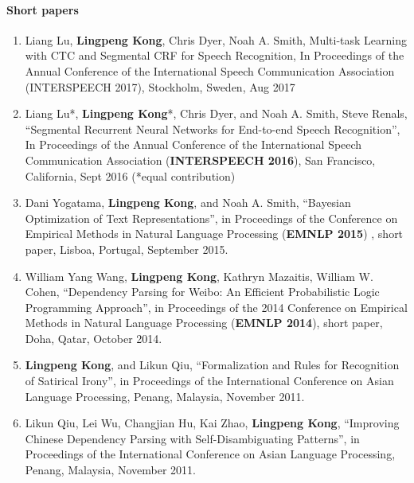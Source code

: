\documentclass[letterpaper]{article}
\begin{document}
\paragraph*{Short papers}
\begin{enumerate}
  \item \label{ctcsegrnn} Liang Lu, \textbf{Lingpeng Kong}, Chris Dyer, Noah A. Smith, Multi-task Learning with CTC and Segmental CRF for Speech Recognition, In Proceedings of the Annual Conference of the International Speech Communication Association (INTERSPEECH 2017), Stockholm, Sweden, Aug 2017

  \item \label{interspeech2016} Liang Lu*, \textbf{Lingpeng Kong}*, Chris Dyer, and Noah A. Smith, Steve Renals, ``Segmental Recurrent Neural Networks for End-to-end Speech Recognition'', In Proceedings of the Annual Conference of the International Speech Communication Association (\textbf{INTERSPEECH 2016}), San Francisco, California, Sept 2016 (*equal contribution)

  \item \label{emnlp2015} Dani Yogatama, \textbf{Lingpeng Kong}, and Noah A. Smith, ``Bayesian Optimization of Text Representations'', in Proceedings of the Conference on Empirical Methods in Natural Language Processing (\textbf{EMNLP 2015}) , short paper, Lisboa, Portugal, September 2015.

  \item \label{emnlp2014b} William Yang Wang, \textbf{Lingpeng Kong}, Kathryn Mazaitis, William W. Cohen, ``Dependency Parsing for Weibo: An Efficient Probabilistic Logic Programming Approach'', in Proceedings of the 2014 Conference on Empirical Methods in Natural Language Processing (\textbf{EMNLP 2014}), short paper, Doha, Qatar, October 2014.  

  \item \label{ialp2011a} \textbf{Lingpeng Kong}, and Likun Qiu, ``Formalization and Rules for Recognition of Satirical Irony'', in Proceedings of the International Conference on Asian Language Processing, Penang, Malaysia, November 2011.

  \item \label{ialp2011b} Likun Qiu, Lei Wu, Changjian Hu, Kai Zhao, \textbf{Lingpeng Kong}, ``Improving Chinese Dependency Parsing with Self-Disambiguating Patterns'', in Proceedings of the International Conference on Asian Language Processing, Penang, Malaysia, November 2011.
\end{enumerate} 
\end{document}
